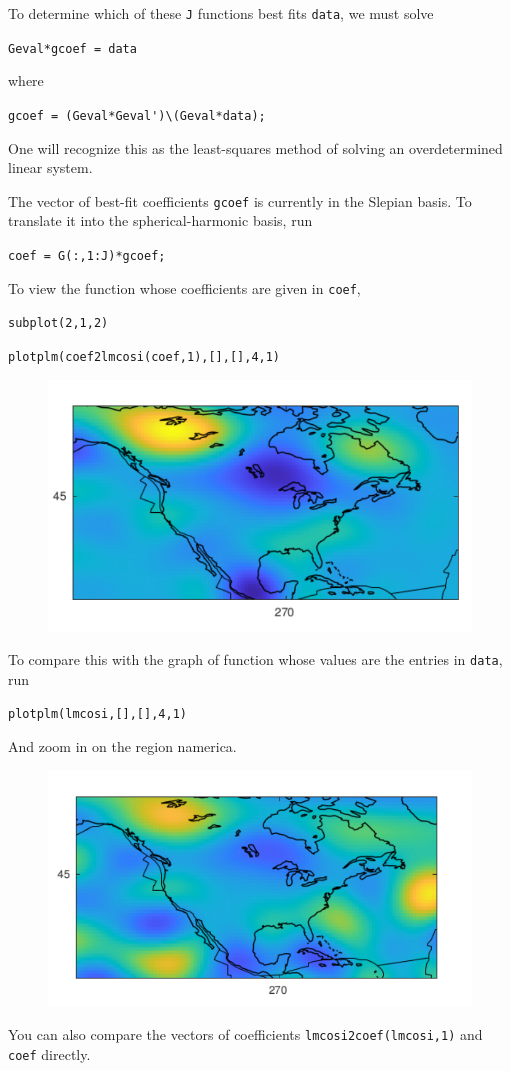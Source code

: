 \documentclass{article}
\begin{document}
To determine which of these \verb!J! functions best fits \verb!data!, we must solve 

\verb!Geval*gcoef = data!

where 

\verb!gcoef = (Geval*Geval')\(Geval*data);!

One will recognize this as the least-squares method of solving an overdetermined linear system.

The vector of best-fit coefficients \verb!gcoef! is currently in the Slepian basis. To translate it into the spherical-harmonic basis, run

\verb!coef = G(:,1:J)*gcoef;!

To view the function whose coefficients are given in \verb!coef!,

\verb!subplot(2,1,2)!

\verb!plotplm(coef2lmcosi(coef,1),[],[],4,1)!

\begin{figure}[H]
\includegraphics[scale=.75]{namerica_solvedcoefficients}
\end{figure}

To compare this with the graph of function whose values are the entries in \verb!data!, run

\verb!plotplm(lmcosi,[],[],4,1)!

And zoom in on the region namerica.

\begin{figure}[H]
\includegraphics[scale=.75]{namerica_compare}
\end{figure}

You can also compare the vectors of coefficients \verb!lmcosi2coef(lmcosi,1)! and \verb!coef!
directly. 
\end{document}
